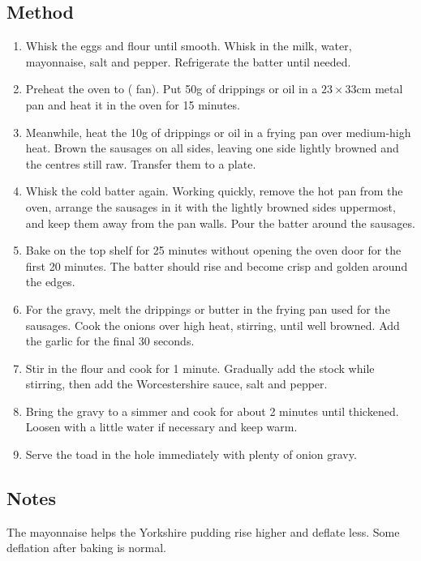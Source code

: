 \subsection{Method}

\begin{enumerate}
    \item Whisk the eggs and flour until smooth. Whisk in the milk, water, mayonnaise, salt and pepper. Refrigerate the batter until needed.
    \item Preheat the oven to  ( fan). Put 50g of drippings or oil in a $23 \times 33$cm metal pan and heat it in the oven for 15 minutes.
    \item Meanwhile, heat the 10g of drippings or oil in a frying pan over medium-high heat. Brown the sausages on all sides, leaving one side lightly browned and the centres still raw. Transfer them to a plate.
    \item Whisk the cold batter again. Working quickly, remove the hot pan from the oven, arrange the sausages in it with the lightly browned sides uppermost, and keep them away from the pan walls. Pour the batter around the sausages.
    \item Bake on the top shelf for 25 minutes without opening the oven door for the first 20 minutes. The batter should rise and become crisp and golden around the edges.
    \item For the gravy, melt the drippings or butter in the frying pan used for the sausages. Cook the onions over high heat, stirring, until well browned. Add the garlic for the final 30 seconds.
    \item Stir in the flour and cook for 1 minute. Gradually add the stock while stirring, then add the Worcestershire sauce, salt and pepper.
    \item Bring the gravy to a simmer and cook for about 2 minutes until thickened. Loosen with a little water if necessary and keep warm.
    \item Serve the toad in the hole immediately with plenty of onion gravy.
\end{enumerate}

\subsection{Notes}

The mayonnaise helps the Yorkshire pudding rise higher and deflate less. Some deflation after baking is normal.
